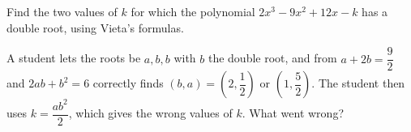 Find the two values of $k$ for which the polynomial $2x^3-9x^2+12x-k$ has a double root, using Vieta's formulas.

A student lets the roots be $a,b,b$ with $b$ the double root, and from $a+2b=\dfrac92$ and $2ab+b^2=6$ correctly finds $(b,a)=\left(2,\dfrac12\right)$ or $\left(1,\dfrac52\right)$. The student then uses $k=\dfrac{ab^2}{2}$, which gives the wrong values of $k$. What went wrong?
